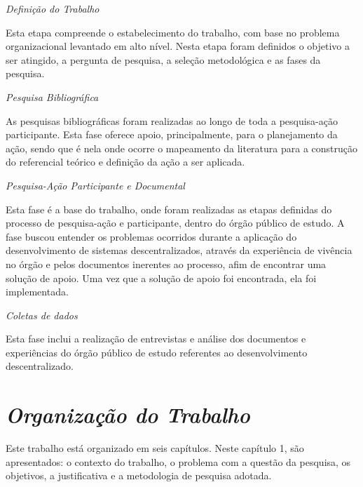 \textit{Definição do Trabalho}

Esta etapa compreende o estabelecimento do trabalho, com base no problema
organizacional levantado em alto nível. Nesta etapa foram definidos o objetivo a ser atingido, a pergunta de pesquisa, a seleção metodológica e as fases da pesquisa.

\textit{Pesquisa Bibliográfica}

As pesquisas bibliográficas foram realizadas ao longo de toda a pesquisa-ação participante. Esta fase oferece apoio, principalmente, para o planejamento da ação, sendo que é nela onde ocorre o mapeamento da literatura para a construção do referencial teórico e definição da ação a ser aplicada.

\textit{Pesquisa-Ação Participante e Documental}

Esta fase é a base do trabalho, onde foram realizadas as etapas definidas do processo de pesquisa-ação e participante, dentro do órgão público de estudo. A fase buscou entender os problemas ocorridos durante a aplicação do desenvolvimento de sistemas descentralizados, através da experiência de vivência no órgão e pelos documentos inerentes ao processo, afim de encontrar uma solução de apoio. Uma vez que a solução de apoio foi encontrada, ela foi implementada.

\textit{Coletas de dados}

Esta fase inclui a realização de entrevistas e análise dos documentos e experiências do órgão público de estudo referentes ao desenvolvimento descentralizado.

\section{\textit{Organização do Trabalho}}

Este trabalho está organizado em seis capítulos. Neste capítulo 1, são
apresentados: o contexto do trabalho, o problema com a questão da pesquisa, os
objetivos, a justificativa e a metodologia de pesquisa adotada.

